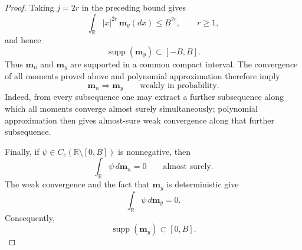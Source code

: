 \documentclass[11pt]{amsart}
\theoremstyle{plain}
\numberwithin{equation}{section}
\numberwithin{theorem}{section}
\numberwithin{figure}{section}
\begin{document}
\begin{proof}
Taking \(j=2r\) in the preceding bound gives
\[
    \int_{\mathbb R}|x|^{2r}\,\mathbf m_y(dx)
    \leq B^{2r},
    \qquad r\geq1,
\]
and hence
\[
    \operatorname{supp}(\mathbf m_y)\subset[-B,B].
\]
Thus \(\mathbf m_n\) and \(\mathbf m_y\) are supported in a common
compact interval. The convergence of all moments proved above and
polynomial approximation therefore imply
\[
    \mathbf m_n\Longrightarrow\mathbf m_y
    \qquad\text{weakly in probability}.
\]
Indeed, from every subsequence one may extract a further subsequence
along which all moments converge almost surely simultaneously;
polynomial approximation then gives almost-sure weak convergence
along that further subsequence.

Finally, if
\(\psi\in C_c(\mathbb R\setminus[0,B])\) is nonnegative, then
\[
    \int_{\mathbb R}\psi\,d\mathbf m_n=0
    \qquad\text{almost surely}.
\]
The weak convergence and the fact that \(\mathbf m_y\) is
deterministic give
\[
    \int_{\mathbb R}\psi\,d\mathbf m_y=0.
\]
Consequently,
\[
    \operatorname{supp}(\mathbf m_y)\subset[0,B].
\]

\end{proof}

\endgroup






\begingroup
\end{document}
